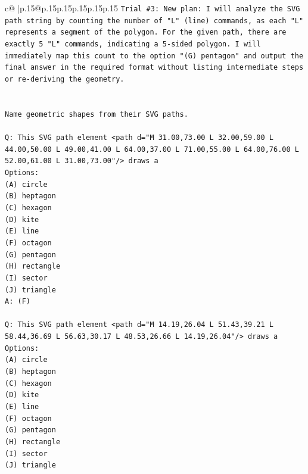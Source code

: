 \documentclass{article}
\begin{document}
{\begin{supertabular}{c@{$\;$}|p{.15\linewidth}@{}p{.15\linewidth}p{.15\linewidth}p{.15\linewidth}p{.15\linewidth}p{.15\linewidth}}
{{{\texttt{Trial \#3: New plan: I will analyze the SVG path string by counting the number of "L" (line) commands, as each "L" represents a segment of the polygon. For the given path, there are exactly 5 "L" commands, indicating a 5{-}sided polygon. I will immediately map this count to the option "(G) pentagon" and output the final answer in the required format without listing intermediate steps or re{-}deriving the geometry.} \\
\\ 
\\ 
\texttt{Name geometric shapes from their SVG paths.} \\
\\ 
\texttt{Q: This SVG path element <path d="M 31.00,73.00 L 32.00,59.00 L 44.00,50.00 L 49.00,41.00 L 64.00,37.00 L 71.00,55.00 L 64.00,76.00 L 52.00,61.00 L 31.00,73.00"/> draws a} \\
\texttt{Options:} \\
\texttt{(A) circle} \\
\texttt{(B) heptagon} \\
\texttt{(C) hexagon} \\
\texttt{(D) kite} \\
\texttt{(E) line} \\
\texttt{(F) octagon} \\
\texttt{(G) pentagon} \\
\texttt{(H) rectangle} \\
\texttt{(I) sector} \\
\texttt{(J) triangle} \\
\texttt{A: (F)} \\
\\ 
\texttt{Q: This SVG path element <path d="M 14.19,26.04 L 51.43,39.21 L 58.44,36.69 L 56.63,30.17 L 48.53,26.66 L 14.19,26.04"/> draws a} \\
\texttt{Options:} \\
\texttt{(A) circle} \\
\texttt{(B) heptagon} \\
\texttt{(C) hexagon} \\
\texttt{(D) kite} \\
\texttt{(E) line} \\
\texttt{(F) octagon} \\
\texttt{(G) pentagon} \\
\texttt{(H) rectangle} \\
\texttt{(I) sector} \\
\texttt{(J) triangle} \\
}}}
\end{supertabular}}
\end{document}
